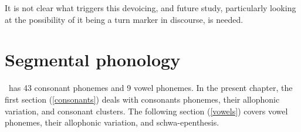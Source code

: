 It is not clear what triggers this devoicing, and future study, particularly looking at the possibility of it being a turn marker in discourse, is needed.



\chapter{Segmental phonology}\label{csANDvs}
\PS\ has 43 consonant phonemes and 9 vowel phonemes. In the present chapter, the first section (\SEC\ref{consonants}) deals with consonants phonemes, their allophonic variation, and consonant clusters. 
The following section (\SEC\ref{vowels}) covers vowel phonemes, their allophonic variation, and schwa-epenthesis. 



